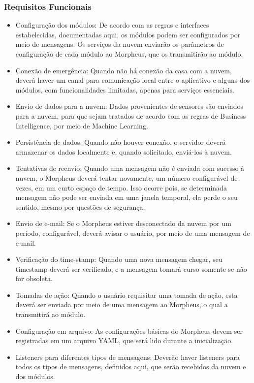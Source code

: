 \subsubsection{Requisitos Funcionais}
\begin{itemize}
\item Configuração dos módulos: De acordo com as regras e interfaces estabelecidas, documentadas aqui, os módulos podem ser configurados por meio de mensagens. Os serviços da nuvem enviarão os parâmetros de configuração de cada módulo ao Morpheus, que os transmitirão ao módulo.
\item Conexão de emergência: Quando não há conexão da casa com a nuvem, deverá haver um canal para comunicação local entre o aplicativo e alguns dos módulos, com funcionalidades limitadas, apenas para serviços essenciais.
\item Envio de dados para a nuvem: Dados provenientes de sensores são enviados para a nuvem, para que sejam tratados de acordo com as regras de Business Intelligence, por meio de Machine Learning.
\item Persistência de dados. Quando não houver conexão, o servidor deverá armazenar os dados localmente e, quando solicitado, enviá-los à nuvem.
\item Tentativas de reenvio: Quando uma mensagem não é enviada com sucesso à nuvem, o Morpheus deverá tentar novamente, um número configurável de vezes, em um curto espaço de tempo. Isso ocorre pois, se determinada mensagem não pode ser enviada em uma janela temporal, ela perde o seu sentido, mesmo por questões de segurança.
\item Envio de e-mail: Se o Morpheus estiver desconectado da nuvem por um período, configurável, deverá avisar o usuário, por meio de uma mensagem de e-mail.
\item Verificação do time-stamp: Quando uma nova mensagem chegar, seu timestamp deverá ser verificado, e a mensagem tomará curso somente se não for obsoleta.
\item Tomadas de ação: Quando o usuário requisitar uma tomada de ação, esta deverá ser enviada por meio de uma mensagem ao Morpheus, o qual a transmitirá ao módulo.
\item Configuração em arquivo: As configurações básicas do Morpheus devem ser registradas em um arquivo YAML, que será lido durante a inicialização.
\item Listeners para diferentes tipos de mensagens: Deverão haver listeners para todos os tipos de mensagens, definidos aqui, que serão recebidos da nuvem e dos módulos.
\end{itemize}

